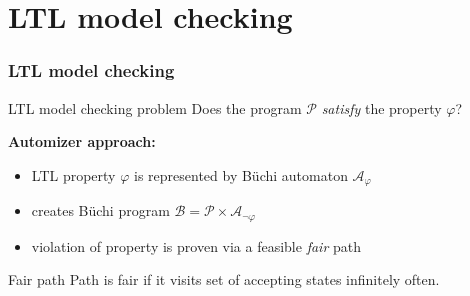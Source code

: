 \documentclass[xcolor=dvipsnames]{beamer}
\begin{document}
\section{LTL model checking}
\begin{frame}[t]
	\frametitle{LTL model checking}
    \begin{block}{LTL model checking problem}
        Does the program $\mathcal{P}$ \emph{satisfy} the property $\varphi$?
    \end{block}

    \pause

    \textbf{Automizer approach:}
    \begin{itemize}[<+->]
        \item LTL property $\varphi$ is represented by Büchi automaton $\mathcal{A}_\varphi$
        \item creates Büchi program $\mathcal{B} = \mathcal{P} \times \mathcal{A}_{\neg \varphi}$
        \item violation of property is proven via a feasible \emph{fair} path
    \end{itemize}

    \pause
    \begin{block}{Fair path}
        Path is fair if it visits set of accepting states infinitely often.
    \end{block}
\end{frame}
\end{document}
